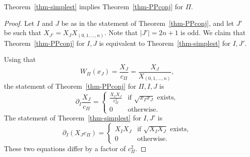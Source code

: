 \begin{lemma} \label{lem-conj-Pi}
Theorem~\ref{thm-simplest} implies Theorem~\ref{thm-PPconj} for $\Pi$.
\end{lemma}
\begin{proof}
Let $I$ and $J$ be as in the statement of Theorem~\ref{thm-PPconj}, and let $J'$ be such that $X_{J'} = X_J X_{(0,1,\dots,n)}$. Note that $|J'|=2n+1$ is odd. We claim that Theorem~\ref{thm-PPconj} for $I,J$ is equivalent to Theorem~\ref{thm-simplest} for $I, J'$. 

Using that 
\[ W_\Pi (x_{J}) = \frac{X_{J}}{c_\Pi}  = \frac{X_{J}}{ X_{(0,1,\dots,n)}}, \]
the statement of Theorem~\ref{thm-PPconj} for $\Pi, I,J$ is
  \[ \partial_I  \frac{X_J}{c_\Pi}  = 
  \begin{cases}
    \frac{X_I X_J}{c_\Pi^2} & \text{if $\sqrt{x_I x_J}$ exists}, \\
    0         &  \text{otherwise.}
  \end{cases}\]
The statement of Theorem~\ref{thm-simplest} for $I, J'$ is 
  \[ \partial_I  ( X_J c_\Pi )  = 
  \begin{cases}
    X_I X_J & \text{if $\sqrt{X_I X_J}$ exists}, \\
    0         &  \text{otherwise.}
  \end{cases}\]
These two equations differ by a factor of $c_\Pi^2$.
\end{proof}
